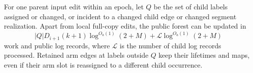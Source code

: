\begin{lemma}
\label{update:recourse}
For one parent input edit within an epoch, let $Q$ be the set of
child labels assigned or changed, or incident to a changed child
edge or changed segment realization.  Apart from local full-copy
edits, the public forest can be updated in
\begin{equation}
 |Q|D_{i+1}(k+1)\log^{O_a(1)}(2+M)
       +\mathcal L\log^{O_a(1)}(2+M)
 \label{update:recourse-cost}
\end{equation}
work and public log records, where $\mathcal L$ is the number of
child log records processed.  Retained arm edges at labels outside
$Q$ keep their lifetimes and maps, even if their arm slot is
reassigned to a different child occurrence.
\end{lemma}

